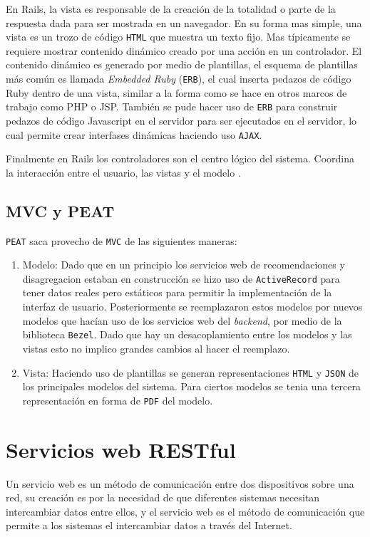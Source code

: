 En Rails, la vista es responsable de la creación de la totalidad o parte de la
respuesta dada para ser mostrada en un navegador. En su forma mas simple, una
vista es un trozo de código \texttt{HTML} que muestra un texto fijo. Mas típicamente
se requiere mostrar contenido dinámico creado por una acción en un controlador.
El contenido dinámico es generado por medio de plantillas, el esquema
de plantillas más común es llamada \textit{Embedded Ruby} (\texttt{ERB}),
el cual inserta pedazos de código Ruby dentro de una vista, similar a la forma
como se hace en otros marcos de trabajo como PHP o JSP. También se pude hacer uso de
\texttt{ERB} para construir pedazos de código Javascript en el servidor
para ser ejecutados en el servidor, lo cual permite crear interfases
dinámicas haciendo uso \texttt{AJAX}.

Finalmente en Rails los controladores son el centro lógico del sistema. Coordina
la interacción entre el usuario, las vistas y el modelo \cite[pag.~29]{15_agile_hansson}.

\subsection{MVC y PEAT}
\texttt{PEAT} saca provecho de \texttt{MVC} de las siguientes maneras:

\begin{enumerate}
\item Modelo: Dado que en un principio los servicios web de recomendaciones y
  disagregacion estaban en construcción se hizo uso de \texttt{ActiveRecord}
  para tener datos reales pero estáticos para permitir la implementación
  de la interfaz de usuario. Posteriormente se reemplazaron estos modelos
  por nuevos modelos que hacían uso de los servicios web del \textit{backend},
  por medio de la biblioteca \texttt{Bezel}. Dado que hay un desacoplamiento
  entre los modelos y las vistas esto no implico grandes cambios al hacer el
  reemplazo.
\item Vista: Haciendo uso de plantillas se generan representaciones \texttt{HTML}
  y \texttt{JSON} de los principales modelos del sistema. Para ciertos modelos se
  tenia una tercera representación en forma de \texttt{PDF} del modelo.
\end{enumerate}

\section{Servicios web RESTful}
Un servicio web es un método de comunicación entre dos dispositivos sobre una red,
su creación es por la necesidad de que diferentes sistemas necesitan intercambiar
datos entre ellos, y el servicio web es el método de comunicación que permite a
los sistemas el intercambiar datos a través del Internet.

